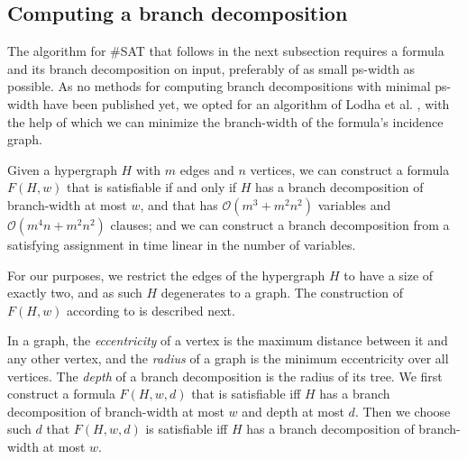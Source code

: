 \subsection{Computing a branch decomposition}

The algorithm for \#SAT that follows in the next subsection requires a formula and its branch decomposition on input, preferably of as small ps-width as possible.
As no methods for computing branch decompositions with minimal ps-width have been published yet, we opted for an algorithm of Lodha et al. \cite{DBLP:journals/tocl/LodhaOS19}, with the help of which we can minimize the branch-width of the formula's incidence graph.


\begin{theorem}
	Given a hypergraph $H$ with $m$ edges and $n$ vertices, we can construct a formula $F(H,w)$ that is satisfiable if and only if $H$ has a branch decomposition of branch-width at most $w$, and that has $\mathcal{O}(m^3 + m^2n^2)$ variables and $\mathcal{O}(m^4n + m^2n^2)$ clauses; and we can construct a branch decomposition from a satisfying assignment in time linear in the number of variables.
\end{theorem}

\noindent
For our purposes, we restrict the edges of the hypergraph $H$ to have a size of exactly two, and as such $H$ degenerates to a graph.
The construction of $F(H,w)$ according to \cite{DBLP:journals/tocl/LodhaOS19} is described next.

In a graph, the {\em eccentricity} of a vertex is the maximum distance between it and any other vertex, and the {\em radius} of a graph is the minimum eccentricity over all vertices.
The {\em depth} of a branch decomposition is the radius of its tree.
We first construct a formula $F(H,w,d)$ that is satisfiable iff $H$ has a branch decomposition of branch-width at most $w$ and depth at most $d$.
Then we choose such $d$ that $F(H,w,d)$ is satisfiable iff $H$ has a branch decomposition of branch-width at most $w$.

